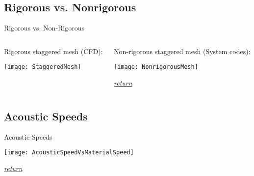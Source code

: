     \subsection*{Rigorous vs. Nonrigorous}
    \begin{frame}[c,label=Nonrigor]{Rigorous vs. Non-Rigorous}\label{Rigorous}
        \begin{columns}
            \begin{column}[T]{0.4\textwidth}
                Rigorous staggered mesh (CFD):                
               \begin{center}
                   \texttt{[image: StaggeredMesh]}
               \end{center}
            \end{column}
            \hfill
            \begin{column}[T]{0.4\textwidth}
                Non-rigorous staggered mesh (System codes):
                \begin{center}
                    \null\vfill
                    \texttt{[image: NonrigorousMesh]}
                    \null\vfill
                \end{center}
                \hfill\textit{\tiny\hyperlink{NonrigorMain}{return}}
            \end{column}
        \end{columns}
    \end{frame}
    
    
    \subsection*{Acoustic Speeds}
    \begin{frame}[c,label=AcousticSpeeds]{Acoustic Speeds}
       \begin{center}
            \texttt{[image: AcousticSpeedVsMaterialSpeed]}
       \end{center}
        \hfill\textit{\tiny\hyperlink{AcousticSpeedsMain}{return}}
    \end{frame}



